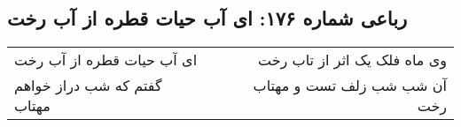 \begin{center}
\section*{رباعی شماره ۱۷۶: ای آب حیات قطره از آب رخت}
\label{sec:0176}
\begin{longtable}{l p{0.5cm} r}
ای آب حیات قطره از آب رخت
&&
وی ماه فلک یک اثر از تاب رخت
\\
گفتم که شب دراز خواهم مهتاب
&&
آن شب شب زلف تست و مهتاب رخت
\\
\end{longtable}
\end{center}
